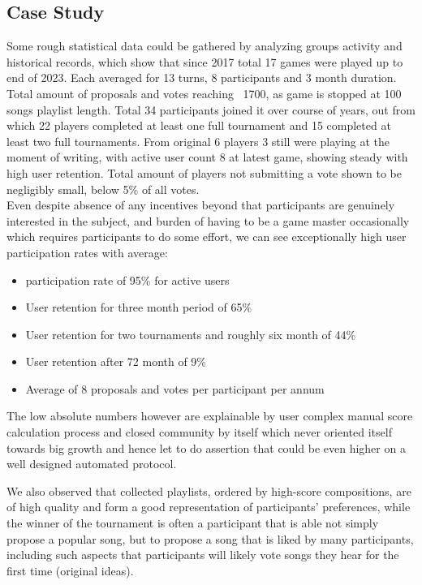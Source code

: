 \documentclass{article}
\begin{document}
\begin{CJK}{UTF8}{gbsn}
\begin{multicols}{2}
        \section{Case Study}
        Some rough statistical data could be gathered by analyzing groups activity and historical records, which show that since 2017 total 17 games were played up to end of 2023. Each averaged for 13 turns, 8 participants and 3 month duration. Total amount of proposals and votes reaching ~1700, as game is stopped at 100 songs playlist length. Total 34 participants joined it over course of years, out from which 22 players completed at least one full tournament and 15 completed at least two full tournaments. From original 6 players 3 still were playing at the moment of writing, with active user count 8 at latest game, showing steady with high user retention. Total amount of players not submitting a vote shown to be negligibly small, below 5\% of all votes. \\
        Even despite absence of any incentives beyond that participants are genuinely interested in the subject, and burden of having to be a game master occasionally which requires participants to do some effort, we can see exceptionally high user participation rates with average:
        \begin{itemize}
            \item participation rate of 95\% for active users
            \item User retention for three month period of 65\%
            \item User retention for two tournaments and roughly six month of 44\%
            \item User retention after 72 month of 9\%
            \item Average of 8 proposals and votes per participant per annum
        \end{itemize}

        The low absolute numbers however are explainable by user complex manual score calculation process and closed community by itself which never oriented itself towards big growth and hence let to do assertion that could be even higher on a well designed automated protocol.

        We also observed that collected playlists, ordered by high-score compositions, are of high quality and form a good representation of participants' preferences, while the winner of the tournament is often a participant that is able not simply propose a popular song, but to propose a song that is liked by many participants, including such aspects that participants will likely vote songs they hear for the first time (original ideas).


\end{multicols}
\end{CJK}
\end{document}
